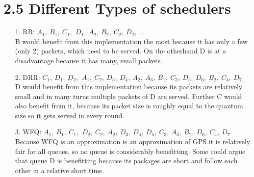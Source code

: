 \documentclass{article}
\begin{document}
	\section*{2.5 Different Types of schedulers}
	\begin{adjustwidth}{2em}{2em}
		\begin{enumerate}
			\item[1. RR:] $A_1, \ B_1, \ C_1, \,\ D_1, \ A_2, \ B_2, \ C_2, \ D_2, \ ...$ \\
			B would benefit from this implementation the most because it has only a few (only 2) packets, which need to be served. On the otherhand D is at a disadvantage because it has many, small packets.
			\item[2. DRR:] $C_1, \ D_1, \ D_2, \,\ A_1, \ C_2, \ D_3, \ D_4, \ A_2, \ A_3, \ B_1, \ C_3, \ D_5, \ D_6, \ B_2, \ C_4, \ D_7$ \\
			D would benefit from this implementation because its packets are relatively small and in many turns multiple packets of D are served. Further C would also benefit from it, because its packet size is roughly equal to the quantum size so it gets served in every round.
			\item[3. WFQ:] $A_1, \ B_1, \ C_1, \,\ D_2, \ C_2, \ A_2, \ D_3, \ D_4, \ D_5, \ C_3, \ A_3, \ B_2, \ D_6, \ C_4, \ D_7$ \\
			Because WFQ is an approximation is an approximation of GPS it is relatively fair for all queues, so no queue is considerably benefitting. Some could argue that queue D is benefitting because its packages are short and follow each other in a relative short time.
		\end{enumerate}
	\end{adjustwidth}
\end{document}
